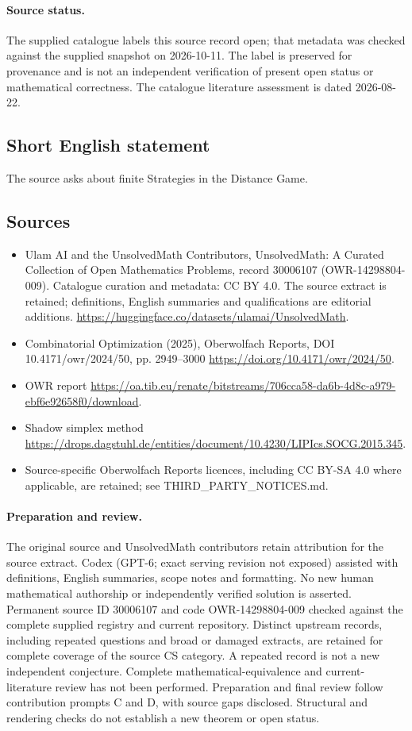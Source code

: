 \documentclass[11pt]{article}
\begin{document}
\paragraph{Source status.}
The supplied catalogue labels this source record open; that metadata was checked against the supplied snapshot on 2026-10-11. The label is preserved for provenance and is not an independent verification of present open status or mathematical correctness. The catalogue literature assessment is dated 2026-08-22.
\subsection{Short English statement}
The source asks about finite Strategies in the Distance Game.
\subsection{Sources}
\begin{itemize}
\item[S1] Ulam AI and the UnsolvedMath Contributors, UnsolvedMath: A Curated Collection of Open Mathematics Problems, record 30006107 (OWR-14298804-009). Catalogue curation and metadata: CC BY 4.0. The source extract is retained; definitions, English summaries and qualifications are editorial additions.
\url{https://huggingface.co/datasets/ulamai/UnsolvedMath}.
\item[S2] Combinatorial Optimization (2025), Oberwolfach Reports, DOI 10.4171/owr/2024/50, pp. 2949--3000
\url{https://doi.org/10.4171/owr/2024/50}.
\item[S3] OWR report
\url{https://oa.tib.eu/renate/bitstreams/706cca58-da6b-4d8c-a979-ebf6e92658f0/download}.
\item[S4] Shadow simplex method
\url{https://drops.dagstuhl.de/entities/document/10.4230/LIPIcs.SOCG.2015.345}.
\item Source-specific Oberwolfach Reports licences, including CC BY-SA 4.0 where applicable, are retained; see THIRD\_PARTY\_NOTICES.md.
\end{itemize}
\paragraph{Preparation and review.}
The original source and UnsolvedMath contributors retain attribution for the source extract. Codex (GPT-6; exact serving revision not exposed) assisted with definitions, English summaries, scope notes and formatting. No new human mathematical authorship or independently verified solution is asserted. Permanent source ID 30006107 and code OWR-14298804-009 checked against the complete supplied registry and current repository. Distinct upstream records, including repeated questions and broad or damaged extracts, are retained for complete coverage of the source CS category. A repeated record is not a new independent conjecture. Complete mathematical-equivalence and current-literature review has not been performed. Preparation and final review follow contribution prompts C and D, with source gaps disclosed. Structural and rendering checks do not establish a new theorem or open status.
\label{end:30006107}
\end{document}
